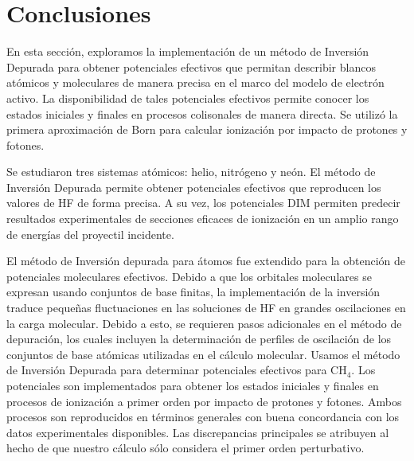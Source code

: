 \newpage
\section{Conclusiones}
\label{conclusion}

En esta sección, exploramos la implementación de un método de Inversión
Depurada para obtener potenciales efectivos que permitan describir
blancos atómicos y moleculares de manera precisa en el marco del modelo 
de electrón activo. La disponibilidad de tales potenciales efectivos 
permite conocer los estados iniciales y finales en procesos colisonales 
de manera directa. Se utilizó la primera aproximación de Born para 
calcular ionización por impacto de protones y fotones. 

Se estudiaron tres sistemas atómicos: helio, nitrógeno y neón. El método 
de Inversión Depurada permite obtener potenciales efectivos que 
reproducen los valores de HF de forma precisa. A su vez, los potenciales
DIM permiten predecir resultados experimentales de secciones eficaces
de ionización en un amplio rango de energías del proyectil incidente.

El método de Inversión depurada para átomos fue extendido para la 
obtención de potenciales moleculares efectivos. Debido a que los 
orbitales moleculares se expresan usando conjuntos de base finitas, 
la implementación de la inversión traduce pequeñas fluctuaciones en las
soluciones de HF en grandes oscilaciones en la carga molecular.
Debido a esto, se requieren pasos adicionales en el método de depuración,
los cuales incluyen la determinación de perfiles de oscilación de los
conjuntos de base atómicas utilizadas en el cálculo molecular.
Usamos el método de Inversión Depurada para determinar potenciales
efectivos para CH$_4$. Los potenciales son implementados para obtener
los estados iniciales y finales en procesos de ionización a primer orden
por impacto de protones y fotones. Ambos procesos son reproducidos en 
términos generales con buena concordancia con los datos experimentales 
disponibles. Las discrepancias principales se atribuyen al hecho de 
que nuestro cálculo sólo considera el primer orden perturbativo.




